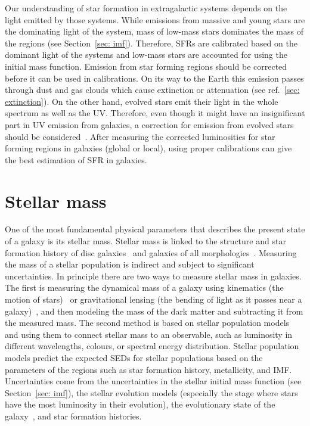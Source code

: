 Our understanding of star formation in extragalactic systems depends on the light emitted by those systems.
While emissions from massive and young stars are the dominating light of the system, mass of low-mass stars dominates the mass of the regions (see Section~\ref{sec: imf}).
Therefore, SFRs are calibrated based on the dominant light of the systems and low-mass stars are accounted for using the initial mass function.
Emission from star forming regions should be corrected before it can be used in calibrations.
On its way to the Earth this emission passes through dust and gas clouds which cause extinction or attenuation (see ref.~\ref{sec: extinction}).
On the other hand, evolved stars emit their light in the whole spectrum as well as the  UV. 
Therefore, even though it might have an insignificant part in UV emission from galaxies, a correction for emission from evolved stars should be considered~\citep{Leroy08}.
After measuring the corrected luminosities for star forming regions in galaxies (global or local), using proper calibrations can give the best estimation of SFR in galaxies. 





\section{Stellar mass}
\label{sec: starmass_intro}
One of the most fundamental physical parameters that describes the present state of a galaxy is its stellar mass. 
Stellar mass is linked to the structure and star formation history of disc galaxies~\citep{Gavvazi96} and  galaxies of all morphologies~\citep{Scodeggio02}. 
Measuring the mass of a stellar population is indirect and subject to significant uncertainties. 
In principle there are two ways to measure stellar mass in galaxies. 
The first is measuring the dynamical mass of a galaxy using kinematics (the motion of stars)~\citep{Cappellari06} or gravitational lensing (the bending of light as it passes near a galaxy)~\citep{Auger09}, and then modeling the mass of the dark matter and subtracting it from the measured mass. 
The second method is based on stellar population models~\citep[e.g.][]{Bruzual93, Kotulla09} and using them to connect stellar mass to an observable, such as luminosity in different wavelengths, colours, or spectral energy distribution. 
Stellar population models predict the expected SEDs for stellar populations based on the parameters of the regions such as star formation history, metallicity, and IMF.
Uncertainties come from the uncertainties in the stellar initial mass function (see Section~\ref{sec: imf}), the stellar evolution models (especially the stage where stars have the most luminosity in their evolution), the evolutionary state of the galaxy~\citep[see][and references therein]{Dalcanton12}, and star formation histories. 


